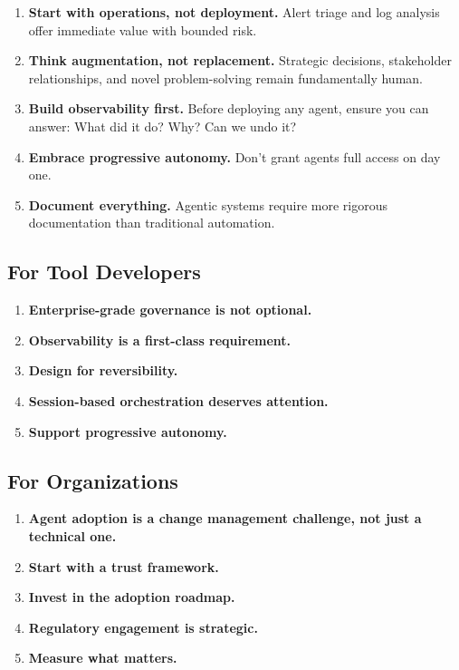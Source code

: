 \begin{enumerate}
    \item \textbf{Start with operations, not deployment.} Alert triage and log analysis offer immediate value with bounded risk.
    \item \textbf{Think augmentation, not replacement.} Strategic decisions, stakeholder relationships, and novel problem-solving remain fundamentally human.
    \item \textbf{Build observability first.} Before deploying any agent, ensure you can answer: What did it do? Why? Can we undo it?
    \item \textbf{Embrace progressive autonomy.} Don't grant agents full access on day one.
    \item \textbf{Document everything.} Agentic systems require more rigorous documentation than traditional automation.
\end{enumerate}

\subsection{For Tool Developers}
\label{subsec:for-developers}

\begin{enumerate}
    \item \textbf{Enterprise-grade governance is not optional.}
    \item \textbf{Observability is a first-class requirement.}
    \item \textbf{Design for reversibility.}
    \item \textbf{Session-based orchestration deserves attention.}
    \item \textbf{Support progressive autonomy.}
\end{enumerate}

\subsection{For Organizations}
\label{subsec:for-organizations}

\begin{enumerate}
    \item \textbf{Agent adoption is a change management challenge, not just a technical one.}
    \item \textbf{Start with a trust framework.}
    \item \textbf{Invest in the adoption roadmap.}
    \item \textbf{Regulatory engagement is strategic.}
    \item \textbf{Measure what matters.}
\end{enumerate}

